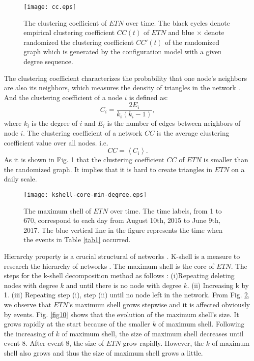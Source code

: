 \documentclass[conference]{IEEEtran}
\begin{document}
\begin{CJK*}{UTF8}{gbsn}
\begin{figure}[htbp]
\centering
\texttt{[image: cc.eps]}
\caption{The clustering coefficient of $ETN$ over time. The black cycles denote empirical clustering coefficient $CC(t)$ of $ETN$ and blue $\times$ denote randomized the clustering coefficient $CC'(t)$ of the randomized graph which is generated by the configuration model with a given degree sequence.}
\label{fig8}
\end{figure}

The clustering coefficient characterizes the probability that one node's neighbors are also its neighbors, which measures the density of triangles in the network \cite{watts1998collective}. And the clustering coefficient of a node $i$ is defined as:
\begin{equation}
C_i = \frac{2E_i}{k_i(k_i-1)} ,
\end{equation}
where $k_i$ is the degree of $i$ and $E_i$ is the number of edges between neighbors of node $i$. The clustering coefficient of a network $CC$ is the average clustering coefficient value over all nodes. i.e.
\begin{equation}
CC = \left\langle C_i \right\rangle .
\end{equation}
As it is shown in Fig. \ref{fig8} that the clustering coefficient $CC$ of $ETN$ is smaller than the randomized graph. It implies that it is hard to create triangles in $ETN$ on a daily scale.


\begin{figure}[htbp]
\centering
\texttt{[image: kshell-core-min-degree.eps]}
\caption{The maximum shell of $ETN$ over time. The time labels, from 1 to 670, correspond to each day from August 10th, 2015 to June 9th, 2017. The blue vertical line in the figure represents the time when the events in Table \ref{tab1} occurred.}
\label{fig9}
\end{figure}

Hierarchy property is a crucial structural of networks \cite{kitsak2010identification}. K-shell is a measure to research the hierarchy of networks \cite{pittel1996sudden}. The maximum shell is the core of $ETN$. The steps for the k-shell decomposition method as follows \cite{carmi2007model}: (i)Repeating deleting nodes with degree $k$ and until there is no node with degree $k$. (ii) Increasing k by 1. (iii) Repeating step (i), step (ii) until no node left in the network. From Fig. \ref{fig9}, we observe that $ETN$'s maximum shell grows stepwise and it is affected obviously by events. Fig. \ref{fig10} shows that the evolution of the maximum shell's size. It grows rapidly at the start because of the smaller $k$ of maximum shell. Following the increasing of $k$ of maximum shell, the size of maximum shell decreases until event 8. After event 8, the size of $ETN$ grow rapidly. However, the $k$ of maximum shell also grows and thus the size of maximum shell grows a little.


\end{CJK*}
\end{document}
